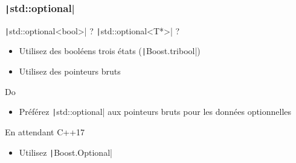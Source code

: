 \documentclass[C++.tex]{subfiles}
\begin{document}
\begin{frame}[fragile]
	\frametitle{\texttt|std::optional|}
	\begin{alertblock}{\texttt|std::optional<bool>| ? \texttt|std::optional<T*>| ?}
		\begin{itemize}
			\item Utilisez des booléens \og trois états\fg{} (\texttt|Boost.tribool|)
			\item Utilisez des pointeurs bruts
		\end{itemize}
	\end{alertblock}

	\begin{exampleblock}{Do}
		\begin{itemize}
			\item Préférez \texttt|std::optional| aux pointeurs bruts pour les données optionnelles
		\end{itemize}

	\end{exampleblock}

	\begin{block}{En attendant C++17}
		\begin{itemize}
			\item Utilisez \texttt|Boost.Optional|
		\end{itemize}
	\end{block}


\end{frame}
\end{document}
